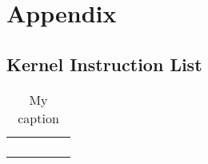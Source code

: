 \section{Appendix}

\appendix
\subsection{Kernel Instruction List}
\label{sec:KernelInstructionList}

\begin{table}[]
	\centering
	\caption{My caption}
	\label{my-label}
	\begin{tabular}{lllll}
		&  &  &  &  \\
		&  &  &  &  \\
		&  &  &  &  \\
		&  &  &  & 
	\end{tabular}
\end{table}

